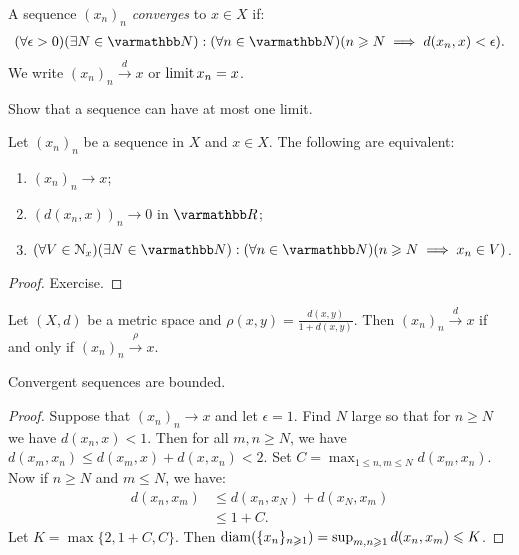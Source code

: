     \begin{definition}

        A sequence $(x_n)_n$ \textit{converges} to $x \in X$ if:
            \begin{equation*}
            \begin{split}
                (\forall \epsilon > 0)(\exists N \in \bfN):(\forall n \in \bfN)(n \geq N \implies d(x_n,x) < \epsilon).
            \end{split}
            \end{equation*}
        We write $(x_n)_n \xrightarrow{d} x$ or $\operatorname*{limit} x_n = x$.
    \end{definition}

    \begin{exercise}
        Show that a sequence can have at most one limit.
    \end{exercise}

    \begin{proposition}\label{prop:sequence-equivalences}
        Let $(x_n)_n$ be a sequence in $X$ and $x \in X$. The following are equivalent:
        \begin{enumerate}[label = (\arabic*),itemsep=1pt,topsep=3pt]
            \item $(x_n)_n \rightarrow x$;
            \item $(d(x_n,x))_n \rightarrow 0$ in $\bfR$;
            \item $(\forall V \in \cN_x)(\exists N \in \bfN):(\forall n\in \bfN)(n \geq N \implies x_n \in V)$. 
        \end{enumerate}
    \end{proposition}
        \begin{proof}
            Exercise.
        \end{proof}

    \begin{exercise}
        Let $(X,d)$ be a metric space and $\rho(x,y) = \frac{d(x,y)}{1 + d(x,y)}$. Then $(x_n)_n \xrightarrow{d} x$ if and only if $(x_n)_n \xrightarrow{\rho} x$.
    \end{exercise}

    \begin{proposition}
        Convergent sequences are bounded.
    \end{proposition}
        \begin{proof}
            Suppose that $(x_n)_n \rightarrow x$ and let $\epsilon = 1$. Find $N$ large so that for $n \geq N$ we have $d(x_n,x) < 1$. Then for all $m,n \geq N$, we have $d(x_m,x_n) \leq d(x_m,x) + d(x,x_n) < 2$. Set $C = \max_{1 \leq n,m \leq N}d(x_m,x_n)$. Now if $n \geq N$ and $m \leq N$, we have:
                \begin{equation*}
                \begin{split}
                    d(x_n,x_m)
                    & \leq d(x_n,x_N) + d(x_N,x_m) \\
                    & \leq 1 + C.
                \end{split}
                \end{equation*}
            Let $K = \max\{2,1+C,C\}$. Then $\operatorname{diam}(\{x_n\}_{n \geqslant 1}) = \sup_{m,n \geqslant 1}d(x_n,x_m) \leqslant K$.
        \end{proof}

